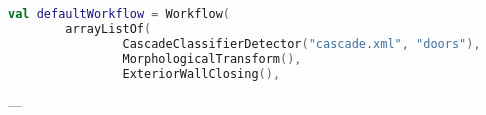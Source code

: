 \begin{lstlisting}[caption={New classifier in default worfklow.}, label={lst:CCDefaultWorkflow}, language=Kotlin, escapechar=$]
val defaultWorkflow = Workflow(
        arrayListOf(
                CascadeClassifierDetector("cascade.xml", "doors"),
                MorphologicalTransform(),
                ExteriorWallClosing(),
\end{lstlisting}









---